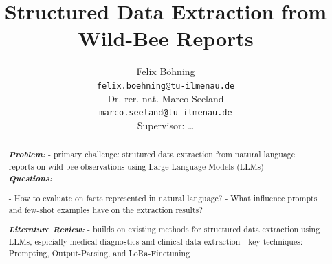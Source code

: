 \documentclass{article}
\title{Structured Data Extraction from Wild-Bee Reports}
\author{
  Felix Böhning
    \\
  \texttt{felix.boehning@tu-ilmenau.de} \\
  \And
  Dr. rer. nat. Marco Seeland \\
  \texttt{marco.seeland@tu-ilmenau.de} \\
  \AND
  Supervisor: \ldots
}
\begin{document}
\maketitle

\begin{abstract}
\textbf{\textit{Problem:}} 
- primary challenge: strutured data extraction from natural language reports on wild bee observations using Large Language Models (LLMs)\\


\textbf{\textit{Questions:}} 

- How to evaluate on facts represented in natural language?
- What influence prompts and few-shot examples have on the extraction results?



\textbf{\textit{Literature Review:}} 
- builds on existing methods for structured data extraction using LLMs, espicially medical diagnostics and clinical data extraction
- key techniques: Prompting, Output-Parsing, and LoRa-Finetuning



\end{abstract}
\end{document}
